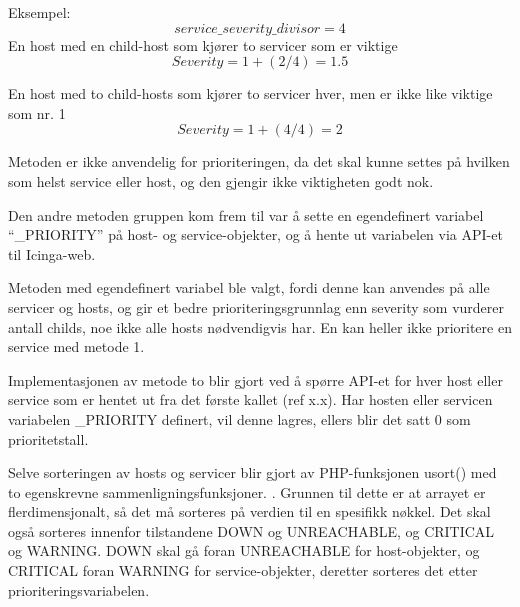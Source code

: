 Eksempel:
\begin{equation}
service\_severity\_divisor = 4 
\end{equation}
En host med en child-host som kjører to servicer som er viktige
\begin{equation}
Severity = 1 + (2/4) = 1.5
\end{equation}

En host med to child-hosts som kjører to servicer hver, men er ikke like viktige som nr. 1
\begin{equation}
Severity = 1 + (4/4) = 2
\end{equation}

Metoden er ikke anvendelig for prioriteringen, da det skal kunne settes på hvilken som helst service eller host, og den gjengir ikke viktigheten godt nok.     

Den andre metoden gruppen kom frem til var å sette en egendefinert variabel “\_PRIORITY” på host- og service-objekter, og å hente ut variabelen via API-et til Icinga-web.

Metoden med egendefinert variabel ble valgt, fordi denne kan anvendes på alle servicer og hosts, og gir et bedre prioriteringsgrunnlag enn severity som vurderer antall childs, noe ikke alle hosts nødvendigvis har. En kan heller ikke prioritere en service med metode 1.

Implementasjonen av metode to blir gjort ved å spørre API-et for hver host eller service som er hentet ut fra det første kallet (ref x.x). Har hosten eller servicen variabelen \_PRIORITY definert, vil denne lagres, ellers blir det satt 0 som prioritetstall.

Selve sorteringen av hosts og servicer blir gjort av PHP-funksjonen usort() med to egenskrevne sammenligningsfunksjoner. \cite{usort}. Grunnen til dette er at arrayet er flerdimensjonalt, så det må sorteres på verdien til en spesifikk nøkkel. Det skal også sorteres innenfor tilstandene DOWN og UNREACHABLE, og CRITICAL og WARNING. DOWN skal gå foran UNREACHABLE for host-objekter, og CRITICAL foran WARNING for service-objekter, deretter sorteres det etter prioriteringsvariabelen.
